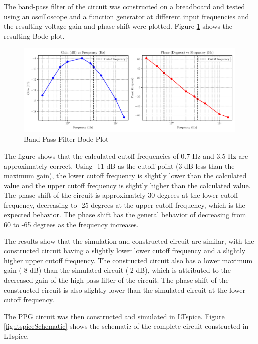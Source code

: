 \documentclass[CMPE]{KGCOEReport}
\begin{document}
The band-pass filter of the circuit was constructed on a breadboard and tested using an oscilloscope and a function generator at different input frequencies and the resulting voltage gain and phase shift were plotted. Figure \ref{fig:bandPassBode} shows the resulting Bode plot.

\begin{figure}[H]
    \centering
    \includegraphics[width=1\textwidth]{band_pass_plot.pdf}
    \caption{Band-Pass Filter Bode Plot}
    \label{fig:bandPassBode}
\end{figure}

The figure shows that the calculated cutoff frequencies of 0.7 Hz and 3.5 Hz are approximately correct. Using -11 dB as the cutoff point (3 dB less than the maximum gain), the lower cutoff frequency is slightly lower than the calculated value and the upper cutoff frequency is slightly higher than the calculated value. The phase shift of the circuit is approximately 30 degrees at the lower cutoff frequency, decreasing to -25 degrees at the upper cutoff frequency, which is the expected behavior. The phase shift has the general behavior of decreasing from 60 to -65 degrees as the frequency increases.

The results show that the simulation and constructed circuit are similar, with the constructed circuit having a slightly lower lower cutoff frequency and a slightly higher upper cutoff frequency. The constructed circuit also has a lower maximum gain (-8 dB) than the simulated circuit (-2 dB), which is attributed to the decreased gain of the high-pass filter of the circuit. The phase shift of the constructed circuit is also slightly lower than the simulated circuit at the lower cutoff frequency.

\bigskip

The PPG circuit was then constructed and simulated in LTspice. Figure \ref{fig:ltspiceSchematic} shows the schematic of the complete circuit constructed in LTspice.
\end{document}
